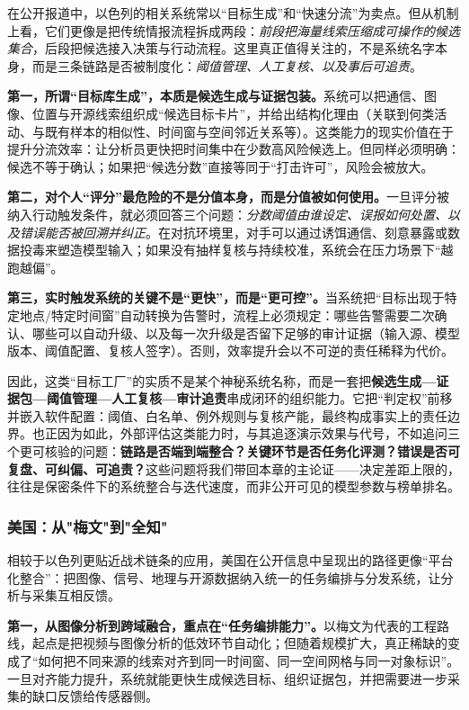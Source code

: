在公开报道中，以色列的相关系统常以“目标生成”和“快速分流”为卖点。但从机制上看，它们更像是把传统情报流程拆成两段：\emph{前段把海量线索压缩成可操作的候选集合}，后段把候选接入决策与行动流程。这里真正值得关注的，不是系统名字本身，而是三条链路是否被制度化：\emph{阈值管理、人工复核、以及事后可追责}。

    {\bfseries 第一，所谓“目标库生成”，本质是候选生成与证据包装。}系统可以把通信、图像、位置与开源线索组织成“候选目标卡片”，并给出结构化理由（关联到何类活动、与既有样本的相似性、时间窗与空间邻近关系等）。这类能力的现实价值在于提升分流效率：让分析员更快把时间集中在少数高风险候选上。但同样必须明确：候选不等于确认；如果把“候选分数”直接等同于“打击许可”，风险会被放大。

        {\bfseries 第二，对个人“评分”最危险的不是分值本身，而是分值被如何使用。}一旦评分被纳入行动触发条件，就必须回答三个问题：\emph{分数阈值由谁设定、误报如何处置、以及错误能否被回溯并纠正}。在对抗环境里，对手可以通过诱饵通信、刻意暴露或数据投毒来塑造模型输入；如果没有抽样复核与持续校准，系统会在压力场景下“越跑越偏”。

        {\bfseries 第三，实时触发系统的关键不是“更快”，而是“更可控”。}当系统把“目标出现于特定地点/特定时间窗”自动转换为告警时，流程上必须规定：哪些告警需要二次确认、哪些可以自动升级、以及每一次升级是否留下足够的审计证据（输入源、模型版本、阈值配置、复核人签字）。否则，效率提升会以不可逆的责任稀释为代价。

因此，这类“目标工厂”的实质不是某个神秘系统名称，而是一套把\textbf{候选生成—证据包—阈值管理—人工复核—审计追责}串成闭环的组织能力。它把“判定权”前移并嵌入软件配置：阈值、白名单、例外规则与复核产能，最终构成事实上的责任边界。也正因为如此，外部评估这类能力时，与其追逐演示效果与代号，不如追问三个更可核验的问题：\textbf{链路是否端到端整合？关键环节是否任务化评测？错误是否可复盘、可纠偏、可追责？}这些问题将我们带回本章的主论证——决定差距上限的，往往是保密条件下的系统整合与迭代速度，而非公开可见的模型参数与榜单排名。

\subsubsection{美国：从"梅文"到"全知"}

相较于以色列更贴近战术链条的应用，美国在公开信息中呈现出的路径更像“平台化整合”：把图像、信号、地理与开源数据纳入统一的任务编排与分发系统，让分析与采集互相反馈。

            {\bfseries 第一，从图像分析到跨域融合，重点在“任务编排能力”。}以梅文为代表的工程路线，起点是把视频与图像分析的低效环节自动化；但随着规模扩大，真正稀缺的变成了“如何把不同来源的线索对齐到同一时间窗、同一空间网格与同一对象标识”。一旦对齐能力提升，系统就能更快生成候选目标、组织证据包，并把需要进一步采集的缺口反馈给传感器侧。

